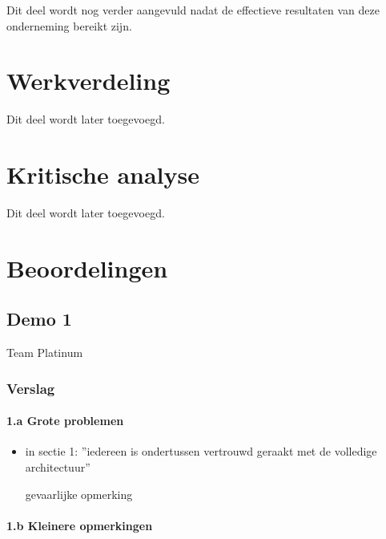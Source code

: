 \documentclass[12pt,a4paper]{report}
\begin{document}
Dit deel wordt nog verder aangevuld nadat de effectieve resultaten van deze onderneming bereikt zijn.

\chapter{Werkverdeling}

Dit deel wordt later toegevoegd.

\chapter{Kritische analyse}


Dit deel wordt later toegevoegd.

\appendix

\chapter{Beoordelingen}

\section{Demo 1}
\begin{center}
Team Platinum
\end{center}

\subsection{ Verslag} 
     
     \subsubsection{1.a Grote problemen}

\begin{itemize}
	\item   in sectie 1: 
	''iedereen is ondertussen vertrouwd geraakt met de volledige architectuur''

 gevaarlijke opmerking 
\end{itemize}

   \subsubsection{1.b Kleinere opmerkingen}
\end{document}

